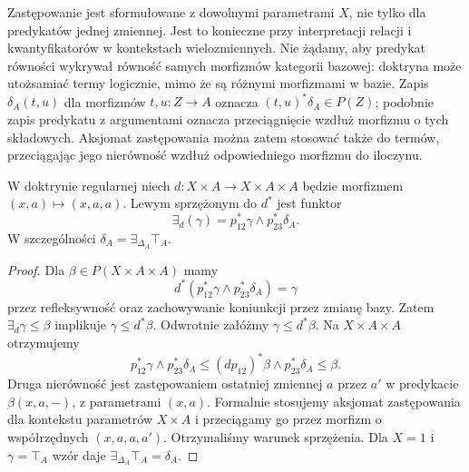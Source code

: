 Zastępowanie jest sformułowane z dowolnymi parametrami $X$, nie tylko dla predykatów jednej zmiennej. Jest to konieczne przy interpretacji relacji i kwantyfikatorów w kontekstach wielozmiennych. Nie żądamy, aby predykat równości wykrywał równość samych morfizmów kategorii bazowej: doktryna może utożsamiać termy logicznie, mimo że są różnymi morfizmami w bazie. Zapis $\delta_A(t,u)$ dla morfizmów $t,u:Z\to A$ oznacza $(t,u)^*\delta_A\in P(Z)$; podobnie zapis predykatu z argumentami oznacza przeciągnięcie wzdłuż morfizmu o tych składowych. Aksjomat zastępowania można zatem stosować także do termów, przeciągając jego nierówność wzdłuż odpowiedniego morfizmu do iloczynu.

\begin{stwierdzenie}\label{cat:prop:cl-doctrine-equality}
W doktrynie regularnej niech $d:X\times A\to X\times A\times A$ będzie morfizmem $(x,a)\mapsto(x,a,a)$. Lewym sprzężonym do $d^*$ jest funktor
\[
 \exists_d(\gamma)=p_{12}^*\gamma\wedge p_{23}^*\delta_A.
\]
W szczególności $\delta_A=\exists_{\Delta_A}\top_A$.
\end{stwierdzenie}
\begin{proof}
Dla $\beta\in P(X\times A\times A)$ mamy
\[
 d^*(p_{12}^*\gamma\wedge p_{23}^*\delta_A)=\gamma
\]
przez refleksywność oraz zachowywanie koniunkcji przez zmianę bazy. Zatem $\exists_d\gamma\leq\beta$ implikuje $\gamma\leq d^*\beta$. Odwrotnie załóżmy $\gamma\leq d^*\beta$. Na $X\times A\times A$ otrzymujemy
\[
 p_{12}^*\gamma\wedge p_{23}^*\delta_A
 \leq (dp_{12})^*\beta\wedge p_{23}^*\delta_A
 \leq\beta.
\]
Druga nierówność jest zastępowaniem ostatniej zmiennej $a$ przez $a'$ w predykacie $\beta(x,a,-)$, z parametrami $(x,a)$. Formalnie stosujemy aksjomat zastępowania dla kontekstu parametrów $X\times A$ i przeciągamy go przez morfizm o współrzędnych $(x,a,a,a')$. Otrzymaliśmy warunek sprzężenia. Dla $X=1$ i $\gamma=\top_A$ wzór daje $\exists_{\Delta_A}\top_A=\delta_A$.
\end{proof}

